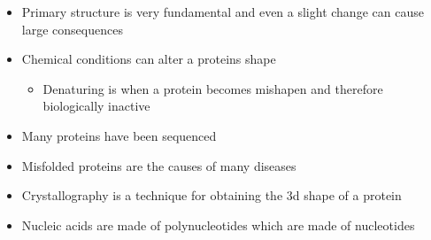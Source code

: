 \documentclass[letterpaper]{article}
\begin{document}
\begin{itemize}
\item Primary structure is very fundamental and even a slight change can
cause large consequences
\item Chemical conditions can alter a proteins shape

\begin{itemize}
\item Denaturing is when a protein becomes mishapen and therefore
biologically inactive
\end{itemize}

\item Many proteins have been sequenced
\item Misfolded proteins are the causes of many diseases
\item Crystallography is a technique for obtaining the 3d shape of a protein
\item Nucleic acids are made of polynucleotides which are made of
nucleotides
\end{itemize}
\end{document}
